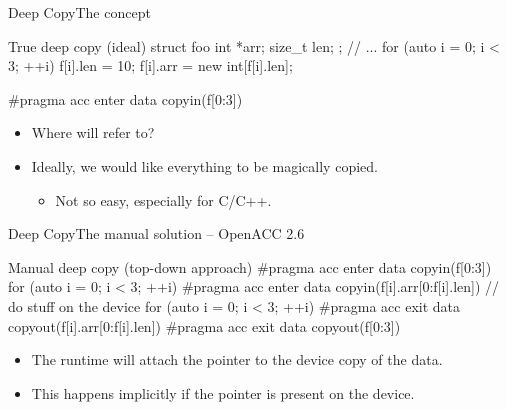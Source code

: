 \documentclass[12pt,aspectratio=169]{beamer}
\newcommand\shinline[2][]{\lstinline[style=shstyle,basicstyle=\ttfamily,#1]!#2!}
\begin{document}

\begin{frame}[fragile]{Deep Copy}{The concept}
  \vspace{.5\baselineskip}
  \begin{Cpplisting}{True deep copy (ideal)}
struct foo {
    int *arr;
    size_t len;
};
// ...
for (auto i = 0; i < 3; ++i) {
    f[i].len = 10;
    f[i].arr = new int[f[i].len];
}

#pragma acc enter data copyin(f[0:3])
  \end{Cpplisting}
  \begin{itemize}
  \item Where will  refer to?
  \item<2-> Ideally, we would like everything to be magically copied.
    \begin{itemize}
    \item Not so easy, especially for C/C++.
    \end{itemize}
  \end{itemize}

\end{frame}

\begin{frame}[fragile]{Deep Copy}{The manual solution -- OpenACC 2.6}
  \begin{Cpplisting}{Manual deep copy (top-down approach)}
#pragma acc enter data copyin(f[0:3])
for (auto i = 0; i < 3; ++i) {
    #pragma acc enter data copyin(f[i].arr[0:f[i].len])
}
// do stuff on the device
for (auto i = 0; i < 3; ++i) {
    #pragma acc exit data copyout(f[i].arr[0:f[i].len])
}
#pragma acc exit data copyout(f[0:3])
  \end{Cpplisting}
  \begin{itemize}
  \item The runtime will attach the  pointer to the device copy of the data.
  \item This happens implicitly if the  pointer is present on the device.
  \end{itemize}
\end{frame}
\end{document}

